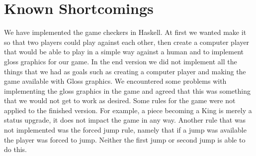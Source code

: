 \documentclass[12pt,a4paper]{article}
\begin{document}
\section{Known Shortcomings}
We have implemented the game checkers in Haskell. At first we wanted make it so that 
two players could play against each other, then create a computer player that would be 
able to play in a simple way against a human and to implement gloss graphics for our 
game.
In the end version we did not implement all the things that we had as goals such as 
creating a computer player and making the game available with Gloss graphics.
We encountered some problems with implementing the gloss graphics in the game and 
agreed that this was something that we would not get to work as desired. 
Some rules for the game were not applied to the finished version. For example, a piece 
becoming a King is merely a status upgrade, it does not impact the game in any way. 
Another rule that was not implemented was the forced jump rule, namely that if a jump 
was available the player was forced to jump. Neither the first jump or second jump is 
able to do this. 
\end{document}
